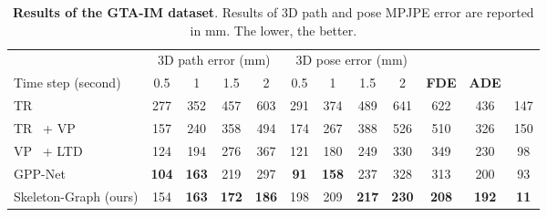 \documentclass[10pt,twocolumn,letterpaper]{article}
\newcommand*{\ours}{Skeleton-Graph }
\begin{document}
\begin{table*}[ht]
\centering
\scriptsize
\begin{tabular}{lccccccccccc} 
\toprule
                                           & \multicolumn{4}{c}{3D path error (mm)}                    & \multicolumn{4}{c}{3D pose error (mm)} & \multicolumn{3}{c}{}                                                  \\
Time step (second)                         & 0.5          & 1            & 1.5          & 2            & 0.5         & 1            & 1.5          & 2            & \textbf{FDE}  & \textbf{ADE}  &     \\ 
\midrule
TR~\cite{vaswani2017attention}                        & 277          & 352          & 457          & 603          & 291         & 374          & 489          & 641          & 622 &436  &147                     \\
TR~\cite{vaswani2017attention} + VP~\cite{pavllo20193d}  & 157          & 240          & 358          & 494          & 174         & 267          & 388          & 526          & 510 &326  &150                     \\
VP~\cite{pavllo20193d} + LTD~\cite{wei2019motion} & 124          & 194          & 276          & 367          & 121         & 180          & 249          & 330          & 349 &230   &98                     \\
GPP-Net~\cite{cao2020long}                                    & \textbf{104} & \textbf{163} & 219 & 297 & \textbf{91} & \textbf{158} & 237 & 328 & 313&200   &93           \\ 
\midrule
\ours (ours)                                      & 154          & \textbf{163}          & \textbf{172}          & \textbf{186}          & 198          & 209          & \textbf{217}          & \textbf{230}          & \textbf{208} &\textbf{192}     &\textbf{11}                  \\
\bottomrule
\end{tabular}
\caption{  {\bf Results of the GTA-IM dataset}. Results of 3D path and pose MPJPE error are reported in mm. The lower, the better.}
\label{tab:gta_all}

\end{table*}
\end{document}
